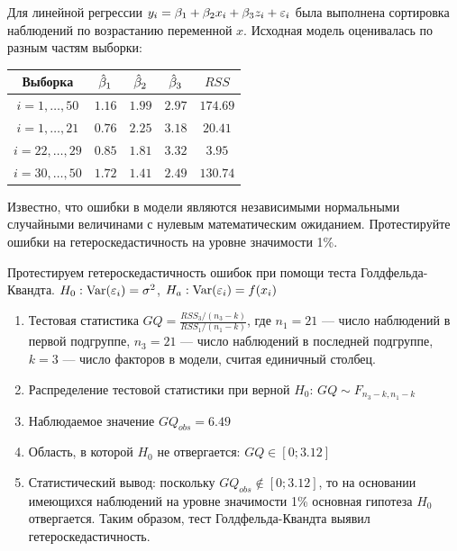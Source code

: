 \begin{problem}
Для линейной регрессии $y_i = \beta_1 + \beta_2 x_i + \beta_3 z_i + \varepsilon_i$ была
выполнена сортировка наблюдений по возрастанию переменной $x$. Исходная модель оценивалась по разным частям выборки:

\begin{tabular}{c|cccc}
\toprule
Выборка & $\hat{\beta}_1$ & $\hat{\beta}_2$ & $\hat{\beta}_3$ & $RSS$ \\
\midrule
$i=1,\ldots, 50$ & $1.16$ & $1.99$ & $2.97$ & $174.69$ \\
$i=1,\ldots, 21$ & $0.76$ & $2.25$ & $3.18$ & $20.41$ \\
$i=22,\ldots, 29$ & $0.85$ & $1.81$ & $3.32$ & $3.95$ \\
$i=30,\ldots, 50$ & $1.72$ & $1.41$ & $2.49$ & $130.74$ \\
\bottomrule
\end{tabular}

Известно, что ошибки в модели являются независимыми нормальными случайными величинами с нулевым математическим ожиданием. Протестируйте
ошибки на гетероскедастичность на уровне значимости 1\%.


\begin{sol}
Протестируем гетероскедастичность ошибок при помощи теста Голдфельда-
Квандта. $H_0: \operatorname{Var}(\varepsilon_i)=\sigma^2$, $H_a: \operatorname{Var}(\varepsilon_i)=f(x_i)$

\begin{enumerate}
\item Тестовая статистика $GQ=\frac{RSS_3/(n_3-k)}{RSS_1/(n_1-k)}$, где $n_1=21$ — число наблюдений в первой подгруппе, $n_3=21$ — число наблюдений в
последней подгруппе, $k=3$ — число факторов в модели, считая единичный столбец.
\item Распределение тестовой статистики при верной $H_0$: $GQ\sim F_{n_3-k,n_1-k}$
\item Наблюдаемое значение $GQ_{obs}=6.49$
\item Область, в которой $H_0$ не отвергается: $GQ\in [0;3.12]$
\item Статистический вывод: поскольку $GQ_{obs} \notin [0;3.12]$, то на основании имеющихся наблюдений на уровне значимости 1\% основная гипотеза $H_0$ отвергается. Таким образом, тест Голдфельда-Квандта выявил гетероскедастичность.
\end{enumerate}
\end{sol}
\end{problem}



